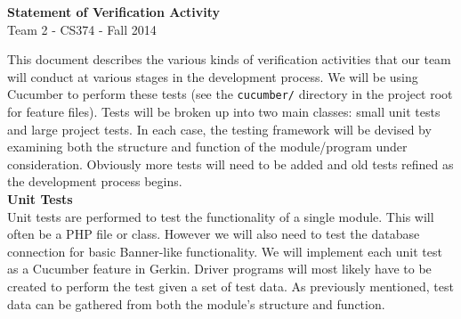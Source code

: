 \documentclass[11pt]{article}
\begin{document}
\begin{center}
\LARGE{\textbf{Statement of Verification Activity}}\\
\normalsize{Team 2 - CS374 - Fall 2014}
\end{center}
\vspace{.1in}

This document describes the various kinds of verification activities that our team will conduct at various
stages in the development process. We will be using Cucumber to perform these tests (see the \texttt{cucumber/}
directory in the project root for feature files). Tests will be broken up into two main classes: small unit tests
and large project tests. In each case, the testing framework will be devised by examining both the structure and
function of the module/program under consideration. Obviously more tests will need to be added and old tests refined
as the development process begins. \\

\hspace{-.25in} \textbf{Unit Tests} \\
Unit tests are performed to test the functionality of a single module. This will often be a PHP file or class. However we will
also need to test the database connection for basic Banner-like functionality. We will implement each unit test as a Cucumber
feature in Gerkin. Driver programs will most likely have to be created to perform the test given a set of test data. As previously
mentioned, test data can be gathered from both the module's structure and function. \\
\end{document}
